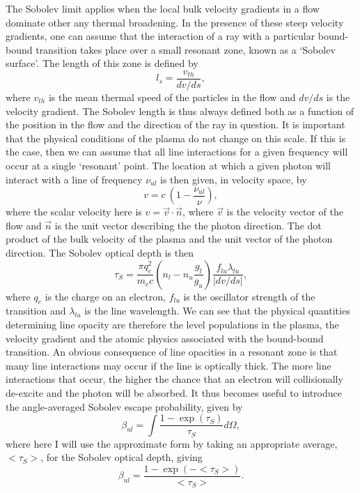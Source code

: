 The Sobolev limit applies when the local bulk velocity gradients in a flow 
dominate other any thermal broadening. In the presence of these steep
velocity gradients, one can assume that the interaction of a ray with a particular 
bound-bound transition takes place over a small resonant zone, known as a 
`Sobolev surface'. The length of this zone is defined by
\begin{equation}
l_s = \frac{v_{th}}{dv / ds},
\end{equation}
where $v_{th}$ is the mean thermal speed of the particles in the flow and 
$dv / ds$ is the velocity gradient. The Sobolev length is thus always defined
both as a function of the position in the flow and the direction of the ray in question.
It is important that the physical conditions of the plasma do not change on this scale.
If this is the case, then we can assume that all line interactions for a given 
frequency will occur at a single `resonant' point. The location at which
a given photon will interact with a line of frequency $\nu_{ul}$
is then given, in velocity space, by
\begin{equation}
v = c~\left(1 - \frac{\nu_{ul}}{\nu}\right),
\label{eq:resonance}
\end{equation}
where the scalar velocity here is $v=\vec{v}\cdot \vec{n}$, where $\vec{v}$
is the velocity vector of the flow and $\vec{n}$ is the unit vector describing the
the photon direction. The dot product of the bulk velocity of the plasma
and the unit vector of the photon direction. The Sobolev optical depth is then
\begin{equation}
\tau_S = \frac{\pi q_e^2}{m_e c}  \left(n_l - n_u \frac{g_l}{g_u} \right) \frac{f_{lu} \lambda_{lu}}{| dv / ds |},
\label{eq:tau_sob}
\end{equation}
where $q_e$ is the charge on an electron, $f_{lu}$ is the oscillator strength of the transition
and $\lambda_{lu}$ is the line wavelength.
We can see that the physical quantities determining line opacity are therefore 
the level populations in the plasma, the velocity gradient and the atomic physics
associated with the bound-bound transition. An obvious consequence of line opacities
in a resonant zone is that many line interactions may occur if the line is
optically thick. The more line interactions that occur, the higher the chance
that an electron will collisionally de-excite and the photon will be absorbed.
It thus becomes useful to introduce the angle-averaged Sobolev escape probability,
given by
\begin{equation}
\beta_{ul} = \int \frac{1 - \exp(\tau_S)}{\tau_S} d\Omega,
\label{eq:beta_sob}
\end{equation}
where here I will use the approximate form by taking an appropriate
average, $<\tau_S>$, for the Sobolev optical depth, giving 
\begin{equation}
\beta_{ul} = \frac{1 - \exp(-<\tau_S>)}{<\tau_S>}.
\label{eq:beta_sob}
\end{equation}


